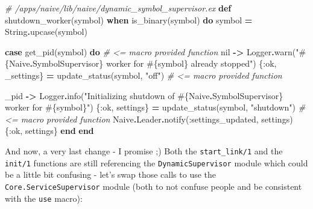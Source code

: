 \documentclass[
]{book}
\newenvironment{Shaded}{\begin{snugshade}}{\end{snugshade}}
\newcommand{\CommentTok}[1]{\textcolor[rgb]{0.56,0.35,0.01}{\textit{#1}}}
\newcommand{\ConstantTok}[1]{\textcolor[rgb]{0.00,0.00,0.00}{#1}}
\newcommand{\KeywordTok}[1]{\textcolor[rgb]{0.13,0.29,0.53}{\textbf{#1}}}
\newcommand{\NormalTok}[1]{#1}
\newcommand{\OperatorTok}[1]{\textcolor[rgb]{0.81,0.36,0.00}{\textbf{#1}}}
\newcommand{\OtherTok}[1]{\textcolor[rgb]{0.56,0.35,0.01}{#1}}
\newcommand{\StringTok}[1]{\textcolor[rgb]{0.31,0.60,0.02}{#1}}
\newcommand{\VariableTok}[1]{\textcolor[rgb]{0.00,0.00,0.00}{#1}}
\begin{document}
\begin{Shaded}
\begin{Highlighting}[]
  \CommentTok{\# /apps/naive/lib/naive/dynamic\_symbol\_supervisor.ex}
  \KeywordTok{def}\NormalTok{ shutdown\_worker(symbol) }\KeywordTok{when}\NormalTok{ is\_binary(symbol) }\KeywordTok{do}
\NormalTok{    symbol }\OperatorTok{=} \ConstantTok{String}\OperatorTok{.}\NormalTok{upcase(symbol)}

    \KeywordTok{case}\NormalTok{ get\_pid(symbol) }\KeywordTok{do} \CommentTok{\# \textless{}= macro provided function}
      \ConstantTok{nil} \OperatorTok{{-}\textgreater{}}
        \ConstantTok{Logger}\OperatorTok{.}\NormalTok{warn(}\StringTok{"}\OtherTok{\#\{}\ConstantTok{Naive}\OperatorTok{.}\ConstantTok{SymbolSupervisor}\OtherTok{\}}\StringTok{ worker for }\OtherTok{\#\{}\NormalTok{symbol}\OtherTok{\}}\StringTok{ already stopped"}\NormalTok{)}
\NormalTok{        \{}\VariableTok{:ok}\NormalTok{, \_settings\} }\OperatorTok{=}\NormalTok{ update\_status(symbol, }\StringTok{"off"}\NormalTok{) }\CommentTok{\# \textless{}= macro provided function}

\NormalTok{      \_pid }\OperatorTok{{-}\textgreater{}}
        \ConstantTok{Logger}\OperatorTok{.}\NormalTok{info(}\StringTok{"Initializing shutdown of }\OtherTok{\#\{}\ConstantTok{Naive}\OperatorTok{.}\ConstantTok{SymbolSupervisor}\OtherTok{\}}\StringTok{ worker for }\OtherTok{\#\{}\NormalTok{symbol}\OtherTok{\}}\StringTok{"}\NormalTok{)}
\NormalTok{        \{}\VariableTok{:ok}\NormalTok{, settings\} }\OperatorTok{=}\NormalTok{ update\_status(symbol, }\StringTok{"shutdown"}\NormalTok{) }\CommentTok{\# \textless{}= macro provided function}
        \ConstantTok{Naive}\OperatorTok{.}\ConstantTok{Leader}\OperatorTok{.}\NormalTok{notify(}\VariableTok{:settings\_updated}\NormalTok{, settings)}
\NormalTok{        \{}\VariableTok{:ok}\NormalTok{, settings\}}
    \KeywordTok{end}
  \KeywordTok{end}
\end{Highlighting}
\end{Shaded}

And now, a very last change - I promise ;) Both the \texttt{start\_link/1} and the \texttt{init/1} functions are still referencing the \texttt{DynamicSupervisor} module which could be a little bit confusing - let's swap those calls to use the \texttt{Core.ServiceSupervisor} module (both to not confuse people and be consistent with the \texttt{use} macro):
\end{document}
